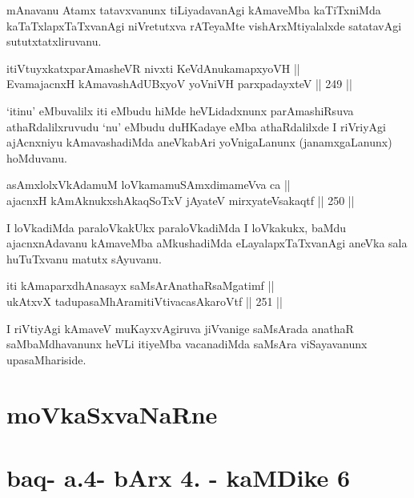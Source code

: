 \begin{artha}
mAnavanu Atamx tatavxvanunx tiLiyadavanAgi kAmaveMba kaTiTxniMda
kaTaTxlapxTaTxvanAgi niVretutxva rATeyaMte vishArxMtiyalalxde satatavAgi
sututxtatxliruvanu.
\end{artha}

\begin{shl}
itiVtuyxkatxparAmasheVR nivxti KeVdAnukamapxyoVH || \\
EvamajacnxH kAmavashAdUBxyoV yoVniVH parxpadayxteV \hfill || 249 ||  
\end{shl}

\begin{artha}
`itinu' eMbuvalilx iti eMbudu hiMde heVLidadxnunx parAmashiRsuva
athaRdalilxruvudu `nu' eMbudu duHKadaye eMba athaRdalilxde I riVriyAgi
ajAcnxniyu kAmavashadiMda aneVkabAri yoVnigaLanunx (janamxgaLanunx)
hoMduvanu.
\end{artha}


\begin{shl}
asAmxlolxVkAdamuM loVkamamuSAmxdimameVva ca || \\
ajacnxH kAmAknukxshAkaqSoTxV jAyateV mirxyateV\s sakaqtf \hfill || 250 ||  
\end{shl}

\begin{artha}
I loVkadiMda paraloVkakUkx paraloVkadiMda I loVkakukx, baMdu
ajacnxnAdavanu kAmaveMba aMkushadiMda eLayalapxTaTxvanAgi aneVka sala
huTuTxvanu matutx sAyuvanu.
\end{artha}

\begin{shl}
iti kAmaparxdhAnasayx saMsArAnathaRsaMgatimf || \\
ukAtxvX tadupasaMhAramitiVtivacasA\s karoVtf \hfill || 251 ||  
\end{shl}

\begin{artha}
I riVtiyAgi kAmaveV muKayxvAgiruva jiVvanige saMsArada anathaR
saMbaMdhavanunx heVLi itiyeMba vacanadiMda saMsAra viSayavanunx
upasaMhariside.
\end{artha}

\section*{moVkaSxvaNaRne}

\section*{baq- a.4- bArx 4. - kaMDike 6}

